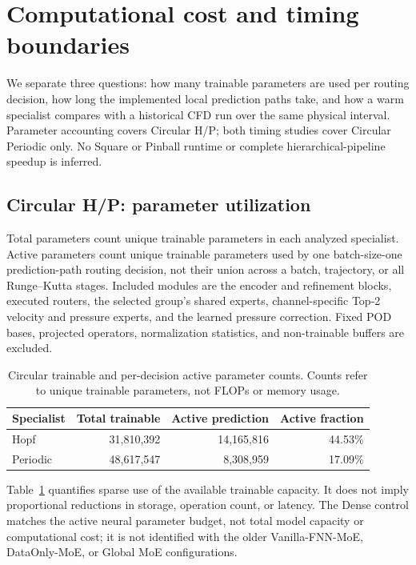 \section{Computational cost and timing boundaries}
\label{app:parameter_counts}

We separate three questions: how many trainable parameters are used
per routing decision, how long the implemented local prediction paths
take, and how a warm specialist compares with a historical CFD run over
the same physical interval. Parameter accounting covers Circular H/P;
both timing studies cover Circular Periodic only. No Square or Pinball
runtime or complete hierarchical-pipeline speedup is inferred.

\subsection{Circular H/P: parameter utilization}

Total parameters count unique trainable parameters in each analyzed
specialist. Active parameters count unique trainable parameters used
by one batch-size-one prediction-path routing decision, not their union
across a batch, trajectory, or all Runge--Kutta stages. Included modules
are the encoder and refinement blocks, executed routers, the selected
group's shared experts, channel-specific Top-2 velocity and pressure
experts, and the learned pressure correction. Fixed POD bases, projected
operators, normalization statistics, and non-trainable buffers are excluded.

\begin{table}[tbp]
\centering
\caption{Circular trainable and per-decision active parameter counts.
Counts refer to unique trainable parameters, not FLOPs or memory usage.}
\label{tab:parameter_counts}
\begin{tabular}{@{}lrrr@{}}
\toprule
Specialist & Total trainable & Active prediction & Active fraction\\
\midrule
Hopf & 31,810,392 & 14,165,816 & 44.53\%\\
Periodic & 48,617,547 & 8,308,959 & 17.09\%\\
\bottomrule
\end{tabular}
\end{table}

Table~\ref{tab:parameter_counts} quantifies sparse use of the available
trainable capacity. It does not imply proportional reductions in storage,
operation count, or latency. The Dense control matches the active neural
parameter budget, not total model capacity or computational cost; it is
not identified with the older Vanilla-FNN-MoE, DataOnly-MoE, or Global MoE
configurations.

